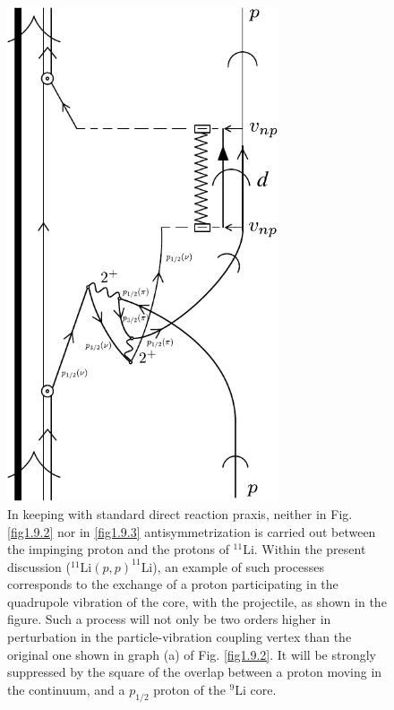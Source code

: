                \begin{figure}[h!]
               \centerline {
               \includegraphics*[width=8cm]{introduccion/figs/fig1_9_4}
               }
               \caption{In keeping with standard direct reaction praxis, neither in Fig. \ref{fig1.9.2} nor in
               \ref{fig1.9.3} antisymmetrization is carried out between the impinging proton and the protons
               of $^{11}$Li. Within the present discussion
               ($^{11}$Li$(p,p)^{11}$Li), an example of such processes corresponds to the exchange
               of a proton participating in the quadrupole vibration of the core, with the projectile, as
               shown in the figure. Such a process will not only be two orders higher in perturbation
               in the particle-vibration coupling vertex than the original one shown in graph (a) of Fig. \ref{fig1.9.2}. It will be strongly suppressed by the square of
               the overlap between a proton moving in the continuum, and a $p_{1/2}$ proton of the $^{9}$Li
               core.}
               \label{fig1.9.4}
               \end{figure}
          
